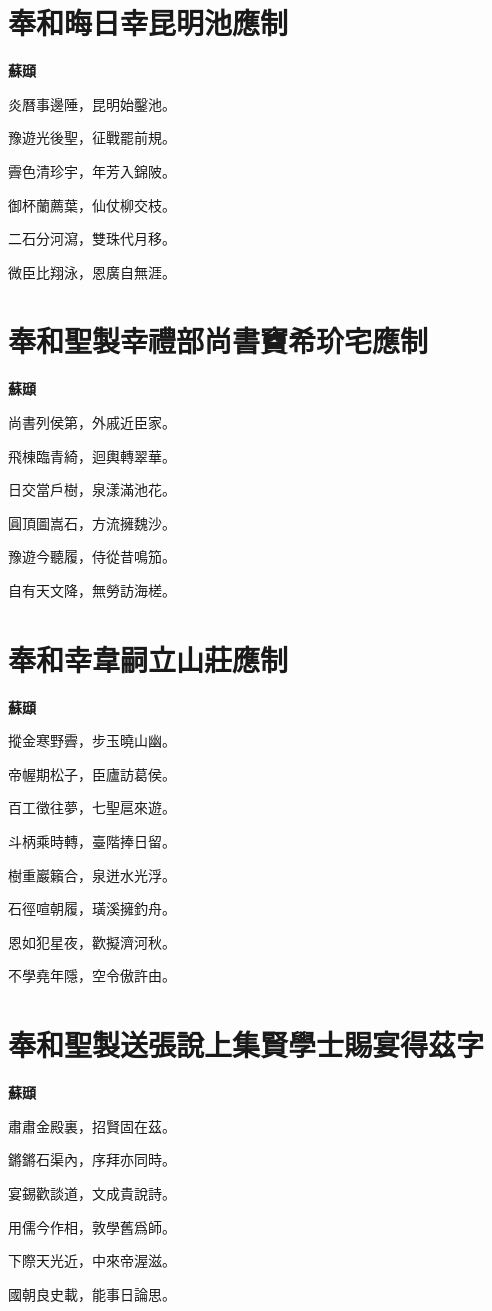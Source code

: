 \documentclass[12pt,a4paper]{ctexbook}
\begin{document}
\section{奉和晦日幸昆明池應制}
\textbf{蘇頲}\par\vspace{0.5em}
炎曆事邊陲，昆明始鑿池。\par
豫遊光後聖，征戰罷前規。\par
霽色清珍宇，年芳入錦陂。\par
御杯蘭薦葉，仙仗柳交枝。\par
二石分河瀉，雙珠代月移。\par
微臣比翔泳，恩廣自無涯。\par

\section{奉和聖製幸禮部尚書竇希玠宅應制}
\textbf{蘇頲}\par\vspace{0.5em}
尚書列侯第，外戚近臣家。\par
飛棟臨青綺，迴輿轉翠華。\par
日交當戶樹，泉漾滿池花。\par
圓頂圖嵩石，方流擁魏沙。\par
豫遊今聽履，侍從昔鳴笳。\par
自有天文降，無勞訪海槎。\par

\section{奉和幸韋嗣立山莊應制}
\textbf{蘇頲}\par\vspace{0.5em}
摐金寒野霽，步玉曉山幽。\par
帝幄期松子，臣廬訪葛侯。\par
百工徵往夢，七聖扈來遊。\par
斗柄乘時轉，臺階捧日留。\par
樹重巖籟合，泉迸水光浮。\par
石徑喧朝履，璜溪擁釣舟。\par
恩如犯星夜，歡擬濟河秋。\par
不學堯年隱，空令傲許由。\par

\section{奉和聖製送張說上集賢學士賜宴得茲字}
\textbf{蘇頲}\par\vspace{0.5em}
肅肅金殿裏，招賢固在茲。\par
鏘鏘石渠內，序拜亦同時。\par
宴錫歡談道，文成貴說詩。\par
用儒今作相，敦學舊爲師。\par
下際天光近，中來帝渥滋。\par
國朝良史載，能事日論思。\par
\end{document}
